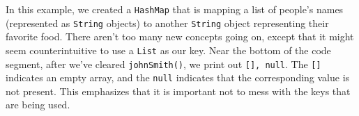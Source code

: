 In this example, we created a \verb!HashMap! that is mapping a list of people's names (represented as \verb!String! objects) to another \verb!String! object representing their favorite food. There aren't too many new concepts going on, except that it might seem counterintuitive to use a \verb!List! as our key. Near the bottom of the code segment, after we've cleared \verb!johnSmith()!, we print out \verb![], null!. The \verb![]! indicates an empty array, and the \verb!null! indicates that the corresponding value is not present. This emphasizes that it is important not to mess with the keys that are being used. 